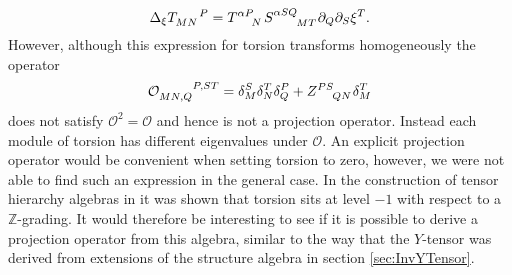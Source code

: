 \begin{equation}
\Delta_\xi \tensor{T}{_{MN}^P} = \tensor{T}{^{\alpha P}_N}\tensor{S}{^{\alpha SQ}_{MT}}\pd_Q\pd_S\xi^T.
\end{equation}
However, although this expression for torsion transforms homogeneously the operator 
\begin{equation}
    \tensor{\mathcal{O}}{_{MN,Q}^{P,ST}} = \delta^S_M\delta^T_N\delta_Q^P+\tensor{Z}{^{PS}_{QN}}\delta^T_M
\end{equation}
does not satisfy $\mathcal{O}^2=\mathcal{O}$ and hence is not a projection operator. Instead each module of torsion has different eigenvalues under $\mathcal{O}$. An explicit projection operator would be convenient when setting torsion to zero, however, we were not able to find such an expression in the general case. In the construction of tensor hierarchy algebras in \cite{Carbone:2018njd} it was shown that torsion sits at level $-1$ with respect to a $\mathbb{Z}$-grading. It would therefore be interesting to see if it is possible to derive a projection operator from this algebra, similar to the way that the $Y$-tensor was derived from extensions of the structure algebra in section \ref{sec:InvYTensor}. 

